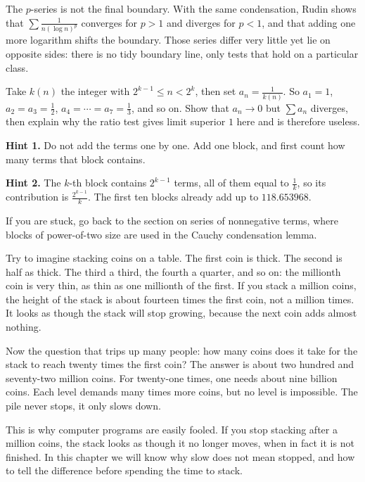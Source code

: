 
The $p$-series is not the final boundary. With the same condensation, Rudin shows that
$\sum \frac{1}{n(\log n)^p}$ converges for $p>1$ and diverges for $p<1$, and that adding
one more logarithm shifts the boundary. Those series differ very little yet lie on opposite
sides: there is no tidy boundary line, only tests that hold on a particular class.

\begin{tantangan}
Take $k(n)$ the integer with $2^{k-1} \le n < 2^k$, then set $a_n = \frac{1}{k(n)}$. So
$a_1 = 1$, $a_2 = a_3 = \tfrac12$, $a_4 = \cdots = a_7 = \tfrac13$, and so on. Show that
$a_n \to 0$ but $\sum a_n$ diverges, then explain why the ratio test gives limit superior
$1$ here and is therefore useless.

\textbf{Hint 1.} Do not add the terms one by one. Add one block, and first count how many
terms that block contains.

\textbf{Hint 2.} The $k$-th block contains $2^{k-1}$ terms, all of them equal to
$\frac{1}{k}$, so its contribution is $\frac{2^{k-1}}{k}$. The first ten blocks already
add up to $118.653968$.

If you are stuck, go back to the section on series of nonnegative terms, where blocks of
power-of-two size are used in the Cauchy condensation lemma.
\end{tantangan}

\begin{untukanak}
Try to imagine stacking coins on a table. The first coin is thick. The second is half as
thick. The third a third, the fourth a quarter, and so on: the millionth coin is very thin,
as thin as one millionth of the first. If you stack a million coins, the height of the
stack is about fourteen times the first coin, not a million times. It looks as though the
stack will stop growing, because the next coin adds almost nothing.

Now the question that trips up many people: how many coins does it take for the stack to
reach twenty times the first coin? The answer is about two hundred and seventy-two million
coins. For twenty-one times, one needs about nine billion coins. Each level demands many
times more coins, but no level is impossible. The pile never stops, it only slows down.

This is why computer programs are easily fooled. If you stop stacking after a million
coins, the stack looks as though it no longer moves, when in fact it is not finished. In
this chapter we will know why slow does not mean stopped, and how to tell the difference
before spending the time to stack.
\end{untukanak}

